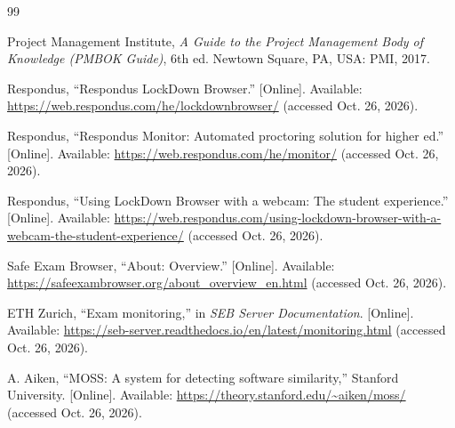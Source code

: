 
\makeatletter
\providecommand*{\bibalias}[1]{%
  \if@filesw\immediate\write\@auxout{\string\bibcite{#1}{\the\value{\@listctr}}}\fi}
\makeatother

\begin{thebibliography}{99}
\raggedright
\expandafter\def\expandafter\UrlBreaks\expandafter{\UrlBreaks\do\-}

 Project Management Institute, \textit{A Guide to the Project Management Body of Knowledge (PMBOK Guide)}, 6th ed. Newtown Square, PA, USA: PMI, 2017.

 Respondus, ``Respondus LockDown Browser.'' [Online]. Available: \url{https://web.respondus.com/he/lockdownbrowser/} (accessed Oct. 26, 2026).

 Respondus, ``Respondus Monitor: Automated proctoring solution for higher ed.'' [Online]. Available: \url{https://web.respondus.com/he/monitor/} (accessed Oct. 26, 2026).

 Respondus, ``Using LockDown Browser with a webcam: The student experience.'' [Online]. Available: \url{https://web.respondus.com/using-lockdown-browser-with-a-webcam-the-student-experience/} (accessed Oct. 26, 2026).

 Safe Exam Browser, ``About: Overview.'' [Online]. Available: \url{https://safeexambrowser.org/about_overview_en.html} (accessed Oct. 26, 2026).

 ETH Zurich, ``Exam monitoring,'' in \textit{SEB Server Documentation}. [Online]. Available: \url{https://seb-server.readthedocs.io/en/latest/monitoring.html} (accessed Oct. 26, 2026).

 A. Aiken, ``MOSS: A system for detecting software similarity,'' Stanford University. [Online]. Available: \url{https://theory.stanford.edu/~aiken/moss/} (accessed Oct. 26, 2026).


\end{thebibliography}
